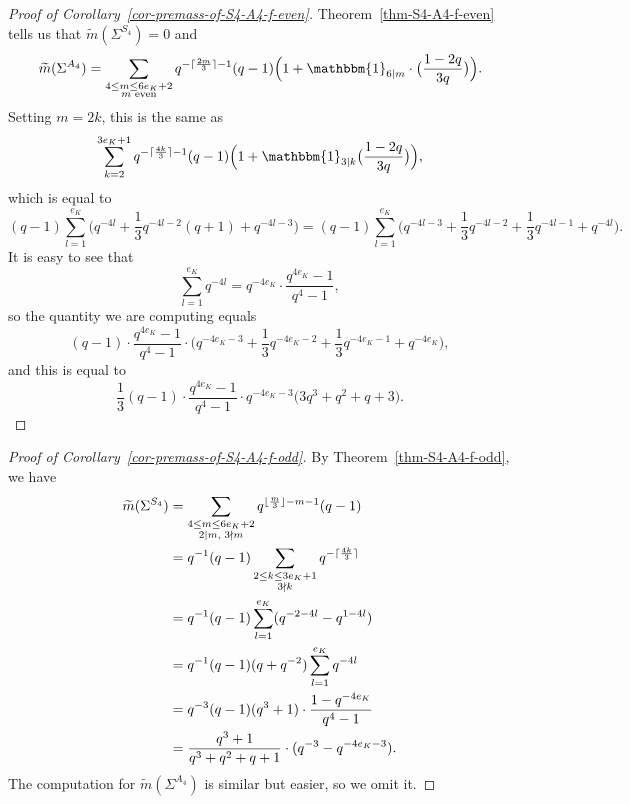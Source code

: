 \documentclass[11pt]{amsart}
\theoremstyle{theorem}
\theoremstyle{example}
\theoremstyle{definition}
\numberwithin{theorem}{section}
\numberwithin{theorem}{section}
\newcommand{\m}{\widetilde{m}}
\begin{document}
\begin{proof}[Proof of Corollary~\ref{cor-premass-of-S4-A4-f-even}]
    Theorem~\ref{thm-S4-A4-f-even} tells us that $\m(\Sigma^{S_4}) = 0$ and
    $$
    \m(\Sigma^{A_4}) = \sum_{\substack{4 \leq m \leq 6e_K + 2 \\ \text{$m$ even}}} q^{- \lceil \frac{2m}{3}\rceil - 1}(q-1)\Big(1 + \mathbbm{1}_{6 \mid m}\cdot \big(\frac{1 - 2q}{3q}\big)\Big).
    $$
    Setting $m = 2k$, this is the same as 
    $$
    \sum_{k=2}^{3e_K + 1}q^{- \lceil \frac{4k}{3}\rceil - 1}(q-1)\Big(1 + \mathbbm{1}_{3\mid k}\big(\frac{1-2q}{3q}\big)\Big),
    $$
    which is equal to 
    $$
    (q-1)\sum_{l=1}^{e_K}\Big(
        q^{-4l} + \frac{1}{3}q^{-4l-2}(q+1) + q^{-4l-3}
    \Big) = (q-1)\sum_{l=1}^{e_K}\Big(
        q^{-4l-3} + \frac{1}{3}q^{-4l-2} + \frac{1}{3}q^{-4l-1} + q^{-4l}    
    \Big).
    $$
    It is easy to see that 
    $$
    \sum_{l=1}^{e_K} q^{-4l} = q^{-4e_K}\cdot \frac{q^{4e_K}-1}{q^4-1},
    $$
    so the quantity we are computing equals 
    $$
    (q-1)\cdot\frac{q^{4e_K}-1}{q^4-1}\cdot \Big(
       q^{-4e_K-3} + \frac{1}{3}q^{-4e_K-2} + \frac{1}{3}q^{-4e_K-1} + q^{-4e_K}
    \Big),
    $$
    and this is equal to 
    $$
    \frac{1}{3}(q-1)\cdot\frac{q^{4e_K}-1}{q^4-1}\cdot q^{-4e_K-3}\Big(
        3q^3 + q^2 + q + 3
    \Big).
    $$
\end{proof}


\begin{proof}[Proof of Corollary~\ref{cor-premass-of-S4-A4-f-odd}]
    By Theorem~\ref{thm-S4-A4-f-odd}, we have 
    \begin{align*}
        \m(\Sigma^{S_4}) &= \sum_{\substack{4 \leq m \leq 6e_K + 2 \\ 2 \mid m, \hspace{0.25em} 3\nmid m}} q^{\lfloor\frac{m}{3} \rfloor - m - 1}(q-1)
        \\
        &= q^{-1}(q-1)\sum_{\substack{2 \leq k \leq 3e_K + 1 \\ 3\nmid k}}q^{-\lceil \frac{4k}{3}\rceil}
        \\
        &= q^{-1}(q-1)\sum_{l=1}^{e_K}(q^{-2 - 4l} - q^{1 - 4l})
        \\
        &= q^{-1}(q-1)(q + q^{-2})\sum_{l=1}^{e_K}q^{-4l}
        \\
        &= q^{-3}(q-1)(q^3+1)\cdot \frac{1 - q^{-4e_K}}{q^4 - 1}
        \\
        &= \frac{q^3 + 1}{q^3 + q^2 + q + 1}\cdot (q^{-3} - q^{-4e_K - 3}). 
    \end{align*}
    The computation for $\m(\Sigma^{A_4})$ is similar but easier, so we omit it. 
\end{proof}
\end{document}
